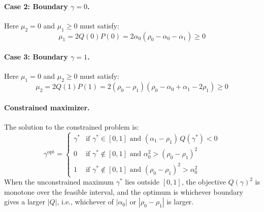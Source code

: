 \documentclass[12pt]{article}
\begin{document}
\paragraph{Case 2: Boundary $\gamma = 0$.}
Here $\mu_2 = 0$ and $\mu_1 \geq 0$ must satisfy:
\begin{equation}
    \mu_1 = 2Q(0)P(0) = 2\alpha_0(\rho_0 - \alpha_0 - \alpha_1) \geq 0
\end{equation}

\paragraph{Case 3: Boundary $\gamma = 1$.}
Here $\mu_1 = 0$ and $\mu_2 \geq 0$ must satisfy:
\begin{equation}
    \mu_2 = 2Q(1)P(1) = 2(\rho_0 - \rho_1)(\rho_0 - \alpha_0 + \alpha_1 - 2\rho_1) \geq 0
\end{equation}

\paragraph{Constrained maximizer.}
The solution to the constrained problem is:
\begin{equation}
    \gamma^{\text{opt}} = \begin{cases}
        \gamma^* & \text{if } \gamma^* \in [0,1] \text{ and } (\alpha_1-\rho_1)\,Q(\gamma^*) < 0 \\[6pt]
        0        & \text{if } \gamma^* \notin [0,1] \text{ and } \alpha_0^2 > (\rho_0-\rho_1)^2 \\[6pt]
        1        & \text{if } \gamma^* \notin [0,1] \text{ and } (\rho_0-\rho_1)^2 > \alpha_0^2
    \end{cases}
\end{equation}
When the unconstrained maximum $\gamma^*$ lies outside $[0,1]$, the objective
$Q(\gamma)^2$ is monotone over the feasible interval, and the optimum is
whichever boundary gives a larger $|Q|$, i.e., whichever of $|\alpha_0|$ or
$|\rho_0 - \rho_1|$ is larger.
\end{document}
